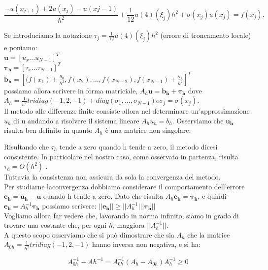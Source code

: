 $$
\frac{-u(x_{j+1}) + 2u(x_j) -u(x{j-1})}{h^2}
 + \frac{1}{12} u(4)(\xi_j)h^2 + \sigma(x_j)u(x_j) = f(x_j) .
$$

Se introduciamo la notazione $\tau_{j}=\frac{1}{12} u(4)(\xi_j)h^2$ (errore di troncamento locale) e poniamo:\\

$\boldsymbol{u}=[u_x...u_{N-1}]^T$\\
$\boldsymbol{\tau_h}=[\tau_x...\tau_{N-1}]^T$\\
$\boldsymbol{b_h}=[(f(x_1) + \frac{g_0}{h^2},f(x_2),...,f(x_{N-2}),f(x_{N-1}) + \frac{g_1}{h^2}]^T$\\

possiamo allora scrivere in forma matriciale,
$A_h\boldsymbol{u} = \boldsymbol{b_h} + \boldsymbol{\tau_h}$
dove $A_h = \frac{1}{h^2}
 tridiag(-1,2,-1) + diag(\sigma_1, ... ,\sigma_{N-1}) e \sigma_j = \sigma(x_j)$.\\
\vspace{1em}
Il metodo alle differenze finite consiste allora nel determinare un’approssimazione $u_h$ di
u andando a risolvere il sistema lineare
$A_hu_h = b_h.$
Osserviamo che $\boldsymbol{u_h}$ risulta ben definito in quanto $A_h$ è una matrice non singolare.\\

\vspace{1em}

Risultando che $\tau_h$ tende a zero quando h tende a zero, il metodo dicesi consistente. In particolare nel nostro caso, come osservato in partenza, risulta $\tau_h = O(h^2)$ .\\
Tuttavia la consistenza non assicura da sola la convergenza del metodo.\\
Per studiarne laconvergenza dobbiamo considerare il comportamento dell’errore $\boldsymbol{e_h} = \boldsymbol{u_h} -\boldsymbol{u}$ quando h tende a zero. Dato che risulta $A_h\boldsymbol{e_h} = \boldsymbol{\tau_h}$, e quindi $\boldsymbol{e_h} = A_h^{-1} \boldsymbol{\tau_h}$ possiamo scrivere: $||\boldsymbol{e_h}||\geq ||A_h^{-1}|| |\boldsymbol{\tau_h}||$\\
Vogliamo allora far vedere che, lavorando in norma infinito, siamo in grado di trovare una costante che, per ogni $h$, maggiora $||A_h^{-1}||$. \\
A questo scopo osserviamo che si può dimostrare che sia $A_h$ che la matrice $A_{0h} = \frac{1}{h^2} tridiag(-1,2,-1)$ hanno inversa non negativa, e si ha: 

$$A_{0h}^{-1}-A{h}^{-1}=A_{0h}^{-1}(A_h-A_{0h})A_h^{-1}\geq0$$

